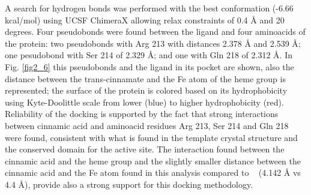 \documentclass[12pt]{article}
\newcommand{\textcite}[1]{\citeauthor{#1}~\citeyear{#1}}
\begin{document}
	A search for hydrogen bonds was performed with the best conformation (-6.66 kcal/mol) using UCSF ChimeraX allowing relax constraints of 0.4 \r{A} and 20 degrees. \cite{chimera,chimera_2,hbond} Four pseudobonds were found between the ligand and four aminoacids of the protein: two pseudobonds with Arg 213 with distances 2.378 \r{A} and 2.539 \r{A}; one pesudobond with Ser 214 of 2.329 \r{A}; and one with Gln 218 of 2.312 \r{A}. In Fig. \ref{fig2_6} this pseudobonds and the ligand in its pocket are shown, also the distance between the trans-cinnamate and the Fe atom of the heme group is represented; the surface of the protein is colored based on its hydrophobicity using Kyte-Doolittle scale from lower (blue) to higher hydrophobicity (red). Reliability of the docking is supported by the fact that strong interactions between cinnamic acid and aminoacid residues Arg 213, Ser 214 and Gln 218 were found, consistent with what is found in the template crystal structure and the conserved domain for the active site. The interaction found between the cinnamic acid and the heme group and the slightly smaller distance between the cinnamic acid and the Fe atom found in this analysis compared to \textcite{cinnamate_oxygenase} (4.142 \r{A} vs 4.4 \r{A}), provide also a strong support for this docking methodology.
\end{document}
